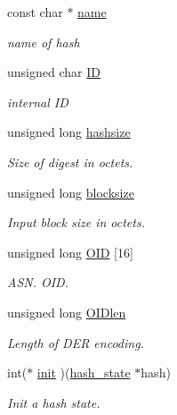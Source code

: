\begin{DoxyCompactItemize}
\item 
const char $\ast$ \mbox{\hyperlink{structltc__hash__descriptor_a34074c695cfb4df7f2a899cf518b4bab}{name}}
\begin{DoxyCompactList}\small\item\em name of hash \end{DoxyCompactList}\item 
unsigned char \mbox{\hyperlink{structltc__hash__descriptor_a6c8fd35cf5797e4c312eb7825e73c625}{ID}}
\begin{DoxyCompactList}\small\item\em internal ID \end{DoxyCompactList}\item 
unsigned long \mbox{\hyperlink{structltc__hash__descriptor_a49bd027653ff21408cb2661748d719ef}{hashsize}}
\begin{DoxyCompactList}\small\item\em Size of digest in octets. \end{DoxyCompactList}\item 
unsigned long \mbox{\hyperlink{structltc__hash__descriptor_ad0ac47c32e536997b59a5571acae2251}{blocksize}}
\begin{DoxyCompactList}\small\item\em Input block size in octets. \end{DoxyCompactList}\item 
unsigned long \mbox{\hyperlink{structltc__hash__descriptor_a9ac18099398a5f78a7380eb9b8d435d2}{O\+ID}} \mbox{[}16\mbox{]}
\begin{DoxyCompactList}\small\item\em A\+S\+N. O\+ID. \end{DoxyCompactList}\item 
unsigned long \mbox{\hyperlink{structltc__hash__descriptor_a2e48a295e28804d5f67a4fd90ed4d8de}{O\+I\+Dlen}}
\begin{DoxyCompactList}\small\item\em Length of D\+ER encoding. \end{DoxyCompactList}\item 
int($\ast$ \mbox{\hyperlink{structltc__hash__descriptor_a941404c4d446f4aa5ad0900a1b1c6838}{init}} )(\mbox{\hyperlink{tomcrypt__hash_8h_af5d2e619794bf148fceb9332d3fcece6}{hash\+\_\+state}} $\ast$hash)
\begin{DoxyCompactList}\small\item\em Init a hash state. \end{DoxyCompactList}\item 

\end{DoxyCompactItemize}
